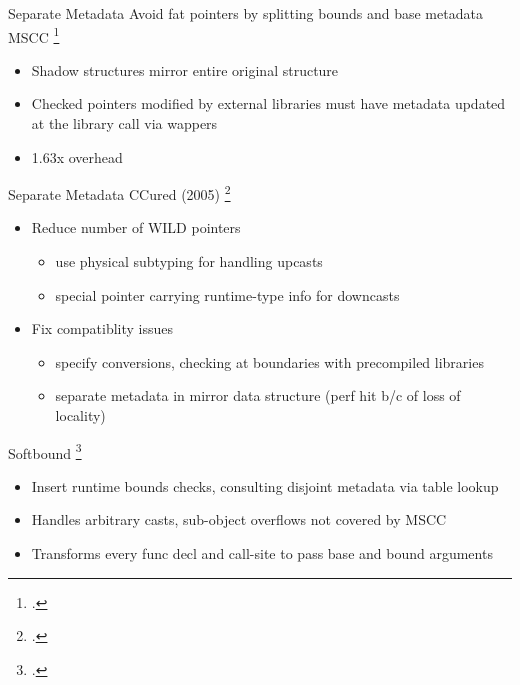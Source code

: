 \documentclass[aspectratio=169]{beamer}
\begin{document}

\begin{frame}[fragile]{Separate Metadata}
Avoid fat pointers by splitting bounds and base metadata
\\
MSCC \footcite{xu_efficient_2004}
    \begin{itemize}
        \item Shadow structures mirror entire original structure
        \item Checked pointers modified by external libraries must have metadata updated at the library call via wappers
        \item 1.63x overhead
    \end{itemize}
\end{frame}

\begin{frame}{Separate Metadata}
CCured (2005) \footcite{necula_ccured:_2005} %
    \begin{itemize}
        \item Reduce number of WILD pointers
            \begin{itemize}
                \item use physical subtyping for handling upcasts
                \item special pointer carrying runtime-type info for downcasts
            \end{itemize}
        \item Fix compatiblity issues
            \begin{itemize}
                \item specify conversions, checking at boundaries with precompiled libraries
                \item separate metadata in mirror data structure (perf hit b/c of loss of locality)
            \end{itemize}
    \end{itemize}
Softbound \footcite{nagarakatte_softbound:_2009}
    \begin{itemize}
        \item Insert runtime bounds checks, consulting disjoint metadata via table lookup
        \item Handles arbitrary casts, sub-object overflows not covered by MSCC
        \item Transforms every func decl and call-site to pass base and bound arguments %
    \end{itemize}
\vspace{0.2in}
\end{frame}
\end{document}
